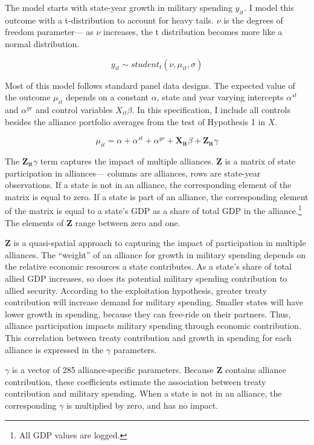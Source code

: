 \documentclass[12pt]{article}
\begin{document}
The model starts with state-year growth in military spending $y_{it}$.
I model this outcome with a t-distribution to account for heavy tails.
$\nu$ is the degrees of freedom parameter--- as $\nu$ increases, the t distribution becomes more like a normal distribution. 


\begin{equation}
y_{it} \sim student_t(\nu, \mu_{it}, \sigma) 
\end{equation}


Most of this model follows standard panel data designs.
The expected value of the outcome $\mu_{it}$ depends on a constant $\alpha$, state and year varying intercepts $\alpha^{st}$ and $\alpha^{yr}$ and control variables $X_{it} \beta$. 
In this specification, I include all controls besides the alliance portfolio averages from the test of Hypothesis 1 in $X$.


\begin{equation}
\mu_{it} = \alpha + \alpha^{st} + \alpha^{yr} + \mathbf{X_{it}} \beta + \mathbf{Z_{it}} \gamma 
\end{equation}


The $\mathbf{Z_{it}} \gamma$ term captures the impact of multiple alliances. 
\textbf{Z} is a matrix of state participation in alliances--- columns are alliances, rows are state-year observations. 
If a state is not in an alliance, the corresponding element of the matrix is equal to zero. 
If a state is part of an alliance, the corresponding element of the matrix is equal to a state's GDP as a share of total GDP in the alliance.\footnote{All GDP values are logged.} 
The elements of \textbf{Z} range between zero and one. 


\textbf{Z} is a quasi-spatial approach to capturing the impact of participation in multiple alliances.
The ``weight'' of an alliance for growth in military spending depends on the relative economic resources a state contributes.  
As a state's share of total allied GDP increases, so does its potential military spending contribution to allied security.  
According to the exploitation hypothesis, greater treaty contribution will increase demand for military spending. 
Smaller states will have lower growth in spending, because they can free-ride on their partners.
Thus, alliance participation impacts military spending through economic contribution. 
This correlation between treaty contribution and growth in spending for each alliance is expressed in the $\gamma$ parameters. 


$\gamma$ is a vector of 285 alliance-specific parameters.  
Because \textbf{Z} contains alliance contribution, these coefficients estimate the association between treaty contribution and military spending. 
When a state is not in an alliance, the corresponding $\gamma$ is multiplied by zero, and has no impact. 
\end{document}
